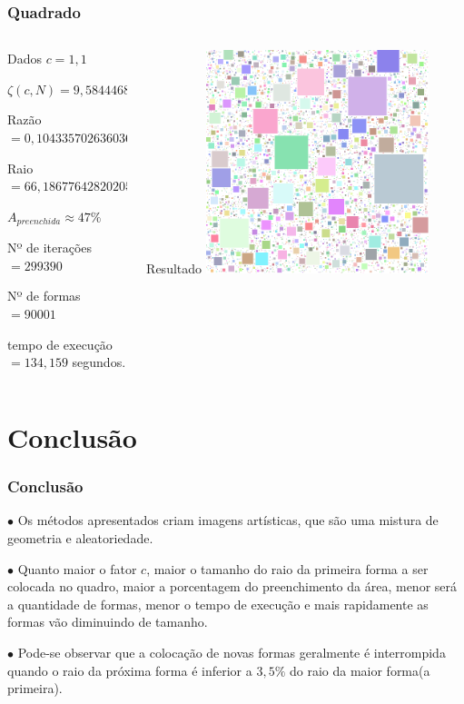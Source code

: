 \documentclass[aspectratio=169]{beamer}
\begin{document}
\begin{frame}
\frametitle{Quadrado}
\begin{columns}[T]
\begin{column}{.5\textwidth}
\begin{block}{\centering Dados}
$c=1,1$
\smallskip

$\zeta(c,N)=9,584446883809193$
\smallskip

Razão $=0,10433570263603623$
\smallskip

Raio $=66,18677642820205$
\smallskip

$A_{preenchida} \approx 47\%$
\smallskip

Nº de iterações $=299390$
\smallskip

Nº de formas $=90001$
\smallskip

tempo de execução $= 134,159$ segundos.
\smallskip
\end{block}
\end{column}

\begin{column}{.5\textwidth}
\begin{block}{\centering Resultado}
\centering
\includegraphics[width=0.7\textwidth]{exemplo7}
\end{block}
\end{column}
\end{columns}
\end{frame}

\section{Conclusão}
\begin{frame}
\frametitle{Conclusão}
$\bullet$ Os métodos apresentados criam imagens artísticas, que são uma mistura de geometria e aleatoriedade.
\medskip

$\bullet$ Quanto maior o fator $c$, maior o tamanho do raio da primeira forma a ser colocada no quadro, maior a porcentagem do preenchimento da área, menor será a quantidade de formas, menor o tempo de execução e mais rapidamente as formas vão diminuindo de tamanho.
\medskip

$\bullet$ Pode-se observar que a colocação de novas formas geralmente é interrompida quando o raio da próxima forma é inferior a $3,5\%$ do raio da maior forma(a primeira).
\end{frame}
\end{document}
